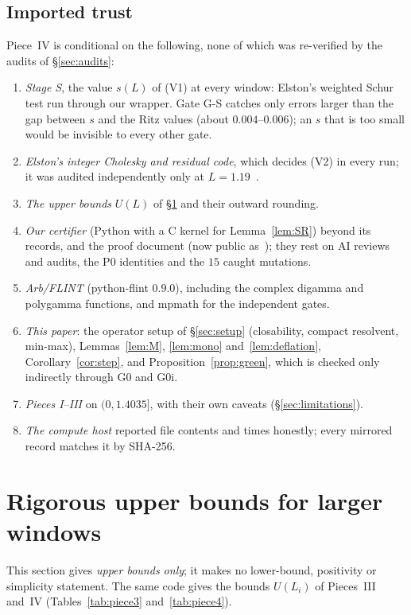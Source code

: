 \documentclass[11pt]{amsart}
\theoremstyle{definition}
\theoremstyle{remark}
\numberwithin{equation}{section}
\begin{document}
\subsection{Imported trust}\label{sec:piece4trust}
Piece~IV is conditional on the following, none of which was re-verified by the audits of \S\ref{sec:audits}:
\begin{enumerate}
\item \emph{Stage S}, the value $s(L)$ of (V1) at every window: Elston's weighted Schur test run through our wrapper. Gate G-S catches only errors larger than the gap between $s$ and the Ritz values (about $0.004$--$0.006$); an $s$ that is too small would be invisible to every other gate.
\item \emph{Elston's integer Cholesky and residual code}, which decides (V2) in every run; it was audited independently only at $L=1.19$~\cite{Elston}.
\item \emph{The upper bounds} $U(L)$ of \S\ref{sec:upper} and their outward rounding.
\item \emph{Our certifier} (Python with a C kernel for Lemma~\ref{lem:SR}) beyond its records, and the proof document (now public as~\cite{supp}); they rest on AI reviews and audits, the P0 identities and the $15$ caught mutations.
\item \emph{Arb/FLINT} (python-flint $0.9.0$), including the complex digamma and polygamma functions, and mpmath for the independent gates.
\item \emph{This paper}: the operator setup of \S\ref{sec:setup} (closability, compact resolvent, min-max), Lemmas~\ref{lem:M}, \ref{lem:mono} and~\ref{lem:deflation}, Corollary~\ref{cor:step}, and Proposition~\ref{prop:green}, which is checked only indirectly through G0 and G0i.
\item \emph{Pieces I--III} on $(0,1.4035]$, with their own caveats (\S\ref{sec:limitations}).
\item \emph{The compute host} reported file contents and times honestly; every mirrored record matches it by SHA-256.
\end{enumerate}

\section{Rigorous upper bounds for larger windows}\label{sec:upper}

This section gives \emph{upper bounds only}; it makes no lower-bound, positivity or simplicity statement. The same code gives the bounds $U(L_i)$ of Pieces~III and~IV (Tables~\ref{tab:piece3} and~\ref{tab:piece4}).
\end{document}
